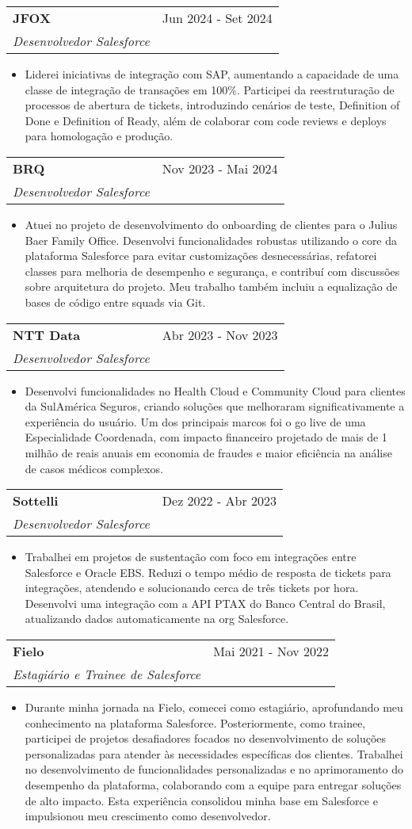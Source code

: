 \documentclass[letterpaper,11pt]{article}
\makeatletter
\newcommand{\resumeItem}[1]{
  \item\small{
    {#1 \vspace{-2pt}}
  }
}
\newcommand{\resumeSubheading}[4]{
  \vspace{-2pt}\item
    \begin{tabular*}{0.97\textwidth}[t]{l@{\extracolsep{\fill}}r}
      \textbf{#1} & #2 \\
      \textit{\small#3} & \textit{\small #4} \\
    \end{tabular*}\vspace{-7pt}
}
\newcommand{\resumeItemListStart}{\begin{itemize}}
\newcommand{\resumeItemListEnd}{\end{itemize}\vspace{-5pt}}
\makeatother
\begin{document}
    \resumeSubheading
      {JFOX}{Jun 2024 - Set 2024}{Desenvolvedor Salesforce}{}
      \resumeItemListStart
        \resumeItem{Liderei iniciativas de integração com SAP, aumentando a capacidade de uma classe de integração de transações em 100\%. Participei da reestruturação de processos de abertura de tickets, introduzindo cenários de teste, Definition of Done e Definition of Ready, além de colaborar com code reviews e deploys para homologação e produção.} 
      \resumeItemListEnd
  
    \resumeSubheading
      {BRQ}{Nov 2023 - Mai 2024}{Desenvolvedor Salesforce}{}
      \resumeItemListStart
        \resumeItem{Atuei no projeto de desenvolvimento do onboarding de clientes para o Julius Baer Family Office. Desenvolvi funcionalidades robustas utilizando o core da plataforma Salesforce para evitar customizações desnecessárias, refatorei classes para melhoria de desempenho e segurança, e contribuí com discussões sobre arquitetura do projeto. Meu trabalho também incluiu a equalização de bases de código entre squads via Git.} 
      \resumeItemListEnd
  
    \resumeSubheading
      {NTT Data}{Abr 2023 - Nov 2023}{Desenvolvedor Salesforce}{}
      \resumeItemListStart
        \resumeItem{Desenvolvi funcionalidades no Health Cloud e Community Cloud para clientes da SulAmérica Seguros, criando soluções que melhoraram significativamente a experiência do usuário. Um dos principais marcos foi o go live de uma Especialidade Coordenada, com impacto financeiro projetado de mais de 1 milhão de reais anuais em economia de fraudes e maior eficiência na análise de casos médicos complexos.} 
      \resumeItemListEnd
  
    \resumeSubheading
      {Sottelli}{Dez 2022 - Abr 2023}{Desenvolvedor Salesforce}{}
      \resumeItemListStart
        \resumeItem{Trabalhei em projetos de sustentação com foco em integrações entre Salesforce e Oracle EBS. Reduzi o tempo médio de resposta de tickets para integrações, atendendo e solucionando cerca de três tickets por hora. Desenvolvi uma integração com a API PTAX do Banco Central do Brasil, atualizando dados automaticamente na org Salesforce.} 
      \resumeItemListEnd
  
    \resumeSubheading
      {Fielo}{Mai 2021 - Nov 2022}{Estagiário e Trainee de Salesforce}{}
      \resumeItemListStart
        \resumeItem{Durante minha jornada na Fielo, comecei como estagiário, aprofundando meu conhecimento na plataforma Salesforce. Posteriormente, como trainee, participei de projetos desafiadores focados no desenvolvimento de soluções personalizadas para atender às necessidades específicas dos clientes. Trabalhei no desenvolvimento de funcionalidades personalizadas e no aprimoramento do desempenho da plataforma, colaborando com a equipe para entregar soluções de alto impacto. Esta experiência consolidou minha base em Salesforce e impulsionou meu crescimento como desenvolvedor.} 
      \resumeItemListEnd
  
\end{document}
